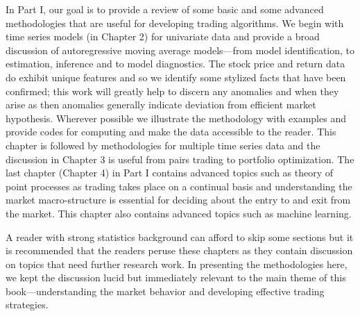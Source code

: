 
In Part I, our goal is to provide a review of some basic and some advanced methodologies that are useful for developing trading algorithms. We begin with time series models (in Chapter 2) for univariate data and provide a broad discussion of autoregressive moving average models---from model identification, to estimation, inference and to model diagnostics. The stock price and return data do exhibit unique features and so we identify some stylized facts that have been confirmed; this work will greatly help to discern any anomalies and when they arise as then anomalies generally indicate deviation from efficient market hypothesis. Wherever possible we illustrate the methodology with examples and provide codes for computing and make the data accessible to the reader. This chapter is followed by methodologies for multiple time series data and the discussion in Chapter 3 is useful from pairs trading to portfolio optimization. The last chapter (Chapter 4) in Part I contains advanced topics such as theory of point processes as trading takes place on a continual basis and understanding the market macro-structure is essential for deciding about the entry to and exit from the market. This chapter also contains advanced topics such as machine learning.


A reader with strong statistics background can afford to skip some sections but it is recommended that the readers peruse these chapters as they contain discussion on topics that need further research work. In presenting the methodologies here, we kept the discussion lucid but immediately relevant to the main theme of this book---understanding the market behavior and developing effective trading strategies. 








